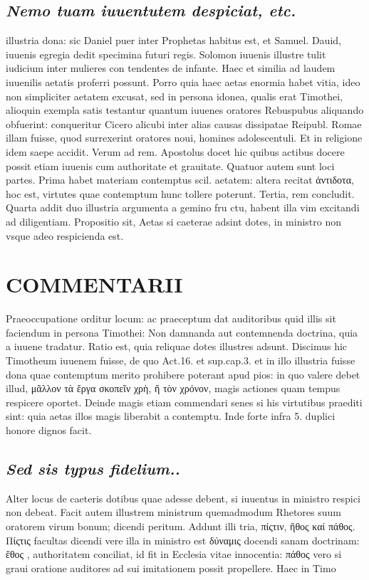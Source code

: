 \documentclass{article}
\begin{document}
\begin{pages}
\subsection*{\textit{Nemo tuam iuuentutem despiciat, etc. }}\pstart illustria dona: sic Daniel puer inter Prophetas habitus est, et Samuel. Dauid, iuuenis egregia dedit specimina futuri regis. Solomon iuuenis illustre tulit iudicium inter mulieres con tendentes de infante. Haec et similia ad laudem iuuenilis aetatis proferri possunt. Porro quia haec aetas enormia habet vitia, ideo non simpliciter aetatem excusat, sed in persona idonea, qualis erat Timothei, alioquin exempla satis testantur quantum iuuenes oratores Rebuspubus aliquando obfuerint: conqueritur Cicero alicubi inter alias causas dissipatae Reipubl. Romae illam fuisse, quod surrexerint oratores noui, homines adolescentuli. Et in religione idem saepe accidit.  \pend\pstart Verum ad rem. Apostolus docet hic quibus actibus docere possit etiam iuuenis cum authoritate et grauitate. Quatuor autem sunt loci partes. Prima habet materiam contemptus scil. aetatem: altera recitat ἀντιδοτα, hoc est, virtutes quae contemptum hunc tollere poterunt. Tertia, rem concludit. Quarta addit duo illustria argumenta a gemino fru ctu, habent illa vim excitandi ad diligentiam.  \pend\pstart Propositio sit, Aetas si caeterae adsint dotes, in ministro non vsque adeo respicienda est.  \pend
\section*{COMMENTARII }
\marginpar{[ p.106 ]}\pstart Praeoccupatione orditur locum: ac praeceptum dat auditoribus quid illis sit faciendum in persona Timothei: Non damnanda aut contemnenda doctrina, quia a iuuene tradatur.  \pend\pstart Ratio est, quia reliquae dotes illustres adsunt. Discimus hic Timotheum iuuenem fuisse, de quo Act.16. et sup.cap.3. et in illo illustria fuisse dona quae contemptum merito prohibere poterant apud pios: in quo valere debet illud, μᾶλλον τὰ ἔργα σκοπεῖν χρὴ, ἤ τὸν χρόνον, magis actiones quam tempus respicere oportet. Deinde magis etiam commendari senes si his virtutibus praediti sint: quia aetas illos magis liberabit a contemptu. Inde forte infra 5. duplici honore dignos facit.  \pend
{}
{}
\subsection*{\textit{Sed sis typus fidelium.. }}\pstart Alter locus de caeteris dotibus quae adesse debent, si iuuentus in ministro respici non debeat. Facit autem illustrem ministrum quemadmodum Rhetores suum oratorem virum bonum; dicendi peritum. Addunt illi tria, πίςτιν, ἤθος καί πάθος. Πίςτις facultas dicendi vere illa in ministro est δύναμις docendi sanam doctrinam:  ἔθος , authoritatem conciliat, id fit in Ecclesia vitae innocentia: πάθος vero si graui oratione auditores ad sui imitationem possit propellere. Haec in Timo\pend

\end{pages}
\end{document}
